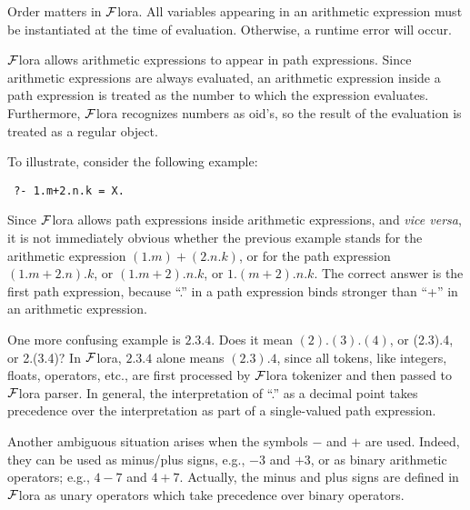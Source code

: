 \documentclass[11pt]{article}
\newcommand{\FLORA}{{\mbox{${\cal F}${\sc lora}}}\xspace}
\begin{document}
Order matters in \FLORA. All variables appearing in an arithmetic
expression must be instantiated at the time of evaluation. Otherwise, a
runtime error will occur.

\FLORA allows arithmetic expressions to appear in path expressions. Since
arithmetic expressions are always evaluated, an arithmetic expression
inside a path expression is treated as the number to which the
expression evaluates. Furthermore, \FLORA recognizes numbers as oid's, so
the result of the evaluation is treated as a regular object.

To illustrate, consider the following example:
\begin{verbatim}
 ?- 1.m+2.n.k = X.
\end{verbatim}
Since \FLORA allows path expressions inside arithmetic expressions, and
{\it vice versa}, it is not immediately obvious whether the previous
example stands for the arithmetic expression $(1.m)+(2.n.k)$, or for the
path expression $(1.m+2.n).k$, or $(1.m + 2).n.k$, or $1.(m+2).n.k$.  The
correct answer is the first path expression, because ``.'' in a path expression
binds stronger than ``+'' in an arithmetic expression.

One more confusing example is $2.3.4$. Does it mean $(2).(3).(4)$, or
(2.3).4, or 2.(3.4)?  In \FLORA, $2.3.4$ alone means $(2.3).4$, since all
tokens, like integers, floats, operators, etc., are first
processed by \FLORA tokenizer and then passed to \FLORA parser.
In general, the interpretation of ``.'' as a decimal point takes precedence
over the interpretation as part of a single-valued path expression.

Another ambiguous situation arises when the symbols $-$ and $+$ are used.
Indeed, they can be used as minus/plus signs, e.g., $-3$ and $+3$, or as binary
arithmetic operators; e.g., $4-7$ and $4+7$. Actually, the minus and plus
signs are defined in \FLORA as unary operators which take precedence over
binary operators.
\end{document}
